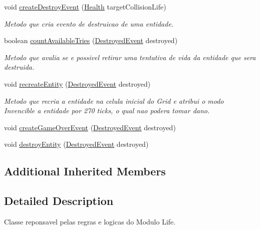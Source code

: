 \begin{DoxyCompactItemize}
void \hyperlink{classbr_1_1unb_1_1unbomber_1_1systems_1_1_life_system_a3295a485d65a8676cca8b72306e44ada}{create\+Destroy\+Event} (\hyperlink{classbr_1_1unb_1_1unbomber_1_1component_1_1_health}{Health} target\+Collision\+Life)
\begin{DoxyCompactList}\small\item\em Metodo que cria evento de destruicao de uma entidade. \end{DoxyCompactList}\item 
boolean \hyperlink{classbr_1_1unb_1_1unbomber_1_1systems_1_1_life_system_a976c49ecfc7f8d47fb2fe41e4f957304}{count\+Available\+Tries} (\hyperlink{classbr_1_1unb_1_1unbomber_1_1event_1_1_destroyed_event}{Destroyed\+Event} destroyed)
\begin{DoxyCompactList}\small\item\em Metodo que avalia se e possivel retirar uma tentativa de vida da entidade que sera destruida. \end{DoxyCompactList}\item 
void \hyperlink{classbr_1_1unb_1_1unbomber_1_1systems_1_1_life_system_a016c596c22b91ab4aa204e4b17ba27e1}{recreate\+Entity} (\hyperlink{classbr_1_1unb_1_1unbomber_1_1event_1_1_destroyed_event}{Destroyed\+Event} destroyed)
\begin{DoxyCompactList}\small\item\em Metodo que recria a entidade na celula inicial do Grid e atribui o modo Invencible a entidade por 270 ticks, o qual nao podera tomar dano. \end{DoxyCompactList}\item 
void \hyperlink{classbr_1_1unb_1_1unbomber_1_1systems_1_1_life_system_a41c42642036835d1b3af52eee01f6b60}{create\+Game\+Over\+Event} (\hyperlink{classbr_1_1unb_1_1unbomber_1_1event_1_1_destroyed_event}{Destroyed\+Event} destroyed)
\item 
void \hyperlink{classbr_1_1unb_1_1unbomber_1_1systems_1_1_life_system_ad5f784dba0df9fb442a036a9426145e8}{destroy\+Entity} (\hyperlink{classbr_1_1unb_1_1unbomber_1_1event_1_1_destroyed_event}{Destroyed\+Event} destroyed)
\end{DoxyCompactItemize}
\subsection*{Additional Inherited Members}


\subsection{Detailed Description}
Classe reponsavel pelas regras e logicas do Modulo Life. 

